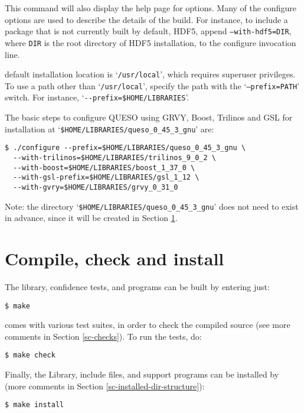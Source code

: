 This command will also display the help page for \Queso{} options. 
 Many of the \Queso{} configure options are used to describe the details of the build. For instance, to include a package that is not currently built by default, HDF5, append \texttt{--with-hdf5=DIR}, where \texttt{DIR} is the root directory of HDF5 installation,  to the configure invocation line. 

 \Queso{} default installation location is `\texttt{/usr/local}', which requires superuser privileges. To use a path
        other than `\texttt{/usr/local}', specify the path with the `\texttt{--prefix=PATH}' switch. For instance, `\verb+--prefix=$HOME/LIBRARIES+'.



The basic steps to configure QUESO using GRVY, Boost, Trilinos and GSL for installation at `\verb+$HOME/LIBRARIES/queso_0_45_3_gnu+' are:
\begin{lstlisting}
$ ./configure --prefix=$HOME/LIBRARIES/queso_0_45_3_gnu \
  --with-trilinos=$HOME/LIBRARIES/trilinos_9_0_2 \
  --with-boost=$HOME/LIBRARIES/boost_1_37_0 \
  --with-gsl-prefix=$HOME/LIBRARIES/gsl_1_12 \
  --with-gvry=$HOME/LIBRARIES/grvy_0_31_0
\end{lstlisting}

Note: the directory `\verb+$HOME/LIBRARIES/queso_0_45_3_gnu+' does not need to exist in advance, since it will be created in Section \ref{sec:install_Queso_make}.


\section{Compile, check and install \Queso{}}\label{sec:install_Queso_make}
%
The library, confidence tests, and programs can be built by entering just:
\begin{lstlisting}
$ make
\end{lstlisting}

\Queso{} comes with various test suites, in order to check the compiled source (see more comments in Section \ref{sc-checks}). To run the tests, do:
\begin{lstlisting}
$ make check
\end{lstlisting}

Finally, the \Queso{} Library, include files, and support programs can be installed by (more comments in Section \ref{sc-installed-dir-structure}):
\begin{lstlisting}
$ make install 
\end{lstlisting}

